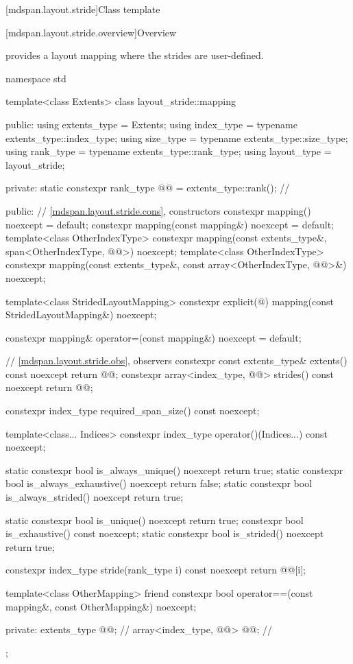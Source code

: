 [mdspan.layout.stride]{Class template }

[mdspan.layout.stride.overview]{Overview}

\pnum
{} provides a layout mapping
where the strides are user-defined.

\begin{codeblock}
namespace std {
  template<class Extents>
  class layout_stride::mapping {
  public:
    using extents_type = Extents;
    using index_type = typename extents_type::index_type;
    using size_type = typename extents_type::size_type;
    using rank_type = typename extents_type::rank_type;
    using layout_type = layout_stride;

  private:
    static constexpr rank_type @@ = extents_type::rank();    // \expos

  public:
    // \ref{mdspan.layout.stride.cons}, constructors
    constexpr mapping() noexcept = default;
    constexpr mapping(const mapping&) noexcept = default;
    template<class OtherIndexType>
      constexpr mapping(const extents_type&, span<OtherIndexType, @@>) noexcept;
    template<class OtherIndexType>
      constexpr mapping(const extents_type&, const array<OtherIndexType, @@>&) noexcept;

    template<class StridedLayoutMapping>
      constexpr explicit(@\seebelow@) mapping(const StridedLayoutMapping&) noexcept;

    constexpr mapping& operator=(const mapping&) noexcept = default;

    // \ref{mdspan.layout.stride.obs}, observers
    constexpr const extents_type& extents() const noexcept { return @@; }
    constexpr array<index_type, @@> strides() const noexcept { return @@; }

    constexpr index_type required_span_size() const noexcept;

    template<class... Indices>
      constexpr index_type operator()(Indices...) const noexcept;

    static constexpr bool is_always_unique() noexcept { return true; }
    static constexpr bool is_always_exhaustive() noexcept { return false; }
    static constexpr bool is_always_strided() noexcept { return true; }

    static constexpr bool is_unique() noexcept { return true; }
    constexpr bool is_exhaustive() const noexcept;
    static constexpr bool is_strided() noexcept { return true; }

    constexpr index_type stride(rank_type i) const noexcept { return @@[i]; }

    template<class OtherMapping>
      friend constexpr bool operator==(const mapping&, const OtherMapping&) noexcept;

  private:
    extents_type @@{};                    // \expos
    array<index_type, @@> @@{};        // \expos
  };
}
\end{codeblock}


